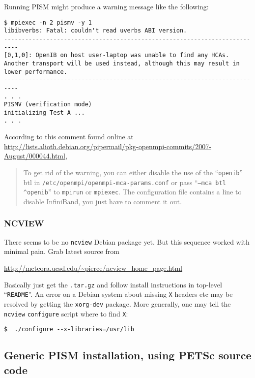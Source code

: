 \documentclass[11pt,final]{amsart}
\begin{document}
Running PISM might produce a warning message like the following:
\begin{verbatim}
$ mpiexec -n 2 pismv -y 1
libibverbs: Fatal: couldn't read uverbs ABI version.
--------------------------------------------------------------------------
[0,1,0]: OpenIB on host user-laptop was unable to find any HCAs.
Another transport will be used instead, although this may result in 
lower performance.
--------------------------------------------------------------------------
. . .
PISMV (verification mode)
initializing Test A ...
. . .
\end{verbatim}
According to this comment found online at \url{http://lists.alioth.debian.org/pipermail/pkg-openmpi-commits/2007-August/000044.html},
\begin{quote}
   To get rid of the warning, you can either disable the use of the ``\texttt{openib}'' btl
   in \texttt{/etc/openmpi/openmpi-mca-params.conf} or pass ``\texttt{--mca btl \^{}openib}'' to \texttt{mpirun}
   or \texttt{mpiexec}.  The configuration file contains a line to disable InfiniBand, you
   just have to comment it out.
\end{quote}
\bigskip

\subsubsection*{NCVIEW}  There seems to be no \texttt{ncview} Debian package
yet.  But this sequence worked with minimal pain.  Grab latest source from
\begin{center}
  \url{http://meteora.ucsd.edu/~pierce/ncview_home_page.html}
\end{center}
Basically just get the \texttt{.tar.gz} and follow install instructions in top-level ``\texttt{README}''.  An error on a Debian system about missing \texttt{X} headers etc may be resolved by getting the \texttt{xorg-dev} package.  More generally, one may tell the \texttt{ncview} \texttt{configure} script where to find \texttt{X}:
\begin{verbatim}
$  ./configure --x-libraries=/usr/lib
\end{verbatim}

\clearpage
\subsection{Generic PISM installation, using PETSc source code}\label{subsec:generic}
\end{document}
